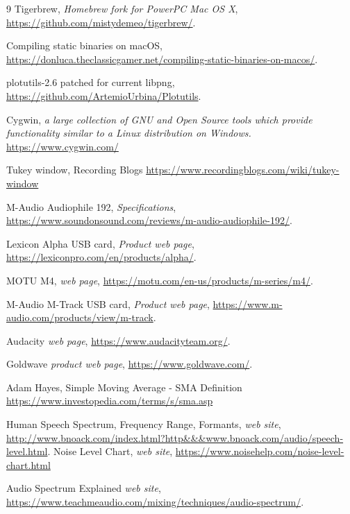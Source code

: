 \documentclass[10pt,a4paper]{report}
\begin{document}
\begin{thebibliography}{9}
	Tigerbrew,
	\textit{Homebrew fork for PowerPC Mac OS X},
	\url{https://github.com/mistydemeo/tigerbrew/}.

	Compiling static binaries on macOS,
	\url{https://donluca.theclassicgamer.net/compiling-static-binaries-on-macos/}.

	plotutils-2.6 patched for current libpng,
	\url{https://github.com/ArtemioUrbina/Plotutils}.
	
	Cygwin,
	\textit{a large collection of GNU and Open Source tools which provide functionality similar to a Linux distribution on Windows.}
	\url{https://www.cygwin.com/}
	
	Tukey window, Recording Blogs
	\url{https://www.recordingblogs.com/wiki/tukey-window}
	
	M-Audio Audiophile 192,
	\textit{Specifications},
	\url{https://www.soundonsound.com/reviews/m-audio-audiophile-192/}.
	
	Lexicon Alpha USB card,
	\textit{Product web page},
	\url{https://lexiconpro.com/en/products/alpha/}.
	
	MOTU M4,
	\textit{web page},
	\url{https://motu.com/en-us/products/m-series/m4/}.

	M-Audio M-Track USB card,
	\textit{Product web page},
	\url{	https://www.m-audio.com/products/view/m-track}.
	
	Audacity
	\textit{web page},
	\url{https://www.audacityteam.org/}.
	
	Goldwave
	\textit{product web page},
	\url{https://www.goldwave.com/}.
	
	Adam Hayes, Simple Moving Average - SMA Definition
	\url{https://www.investopedia.com/terms/s/sma.asp}
	
	Human Speech Spectrum, Frequency Range, Formants, 
	\textit{web site},
	\url{http://www.bnoack.com/index.html?http&&&www.bnoack.com/audio/speech-level.html}.
	Noise Level Chart, \textit{web site},
	\url{https://www.noisehelp.com/noise-level-chart.html}
	
	Audio Spectrum Explained
	\textit{web site},
	\url{https://www.teachmeaudio.com/mixing/techniques/audio-spectrum/}.
\end{thebibliography}

\printglossaries
\end{document}
